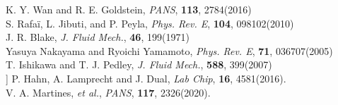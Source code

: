 \documentclass[11pt, a4j, dvipdfmx]{jarticle}
\begin{document}
\renewcommand{\refname}{参考文献}

\begin{thebibliography}{99}
%
K. Y. Wan and R. E. Goldstein, \textit{PANS}, \textbf{113}, 2784(2016)\\

S. Rafa\"i, L. Jibuti, and P. Peyla, \textit{Phys. Rev. E}, \textbf{104}, 098102(2010) \\

%
J. R. Blake, \textit{J. Fluid Mech.}, \textbf{46}, 199(1971) \\

%
Yasuya Nakayama and Ryoichi Yamamoto, \textit{Phys. Rev. E}, \textbf{71}, 036707(2005)\\

%
T. Ishikawa and T. J. Pedley, \textit{J. Fluid Mech.}, \textbf{588}, 399(2007) \\

%
] P. Hahn, A. Lamprecht and J. Dual, \textit{Lab Chip}, \textbf{16}, 4581(2016). \\

%
V. A. Martines, \textit{et al.}, \textit{PANS}, \textbf{117}, 2326(2020). 
\vspace{-8truemm}\\
\end{thebibliography}
\end{document}
